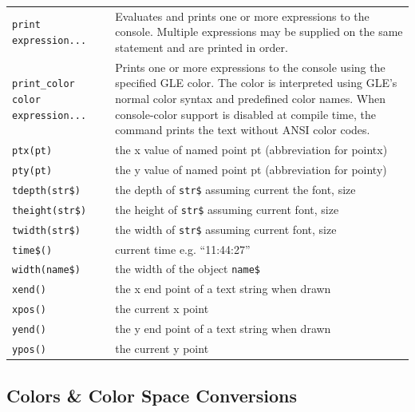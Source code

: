 \begin{supertabular}{lp{10cm}}
{\tt print expression...}  & Evaluates and prints one or more expressions to the console. Multiple expressions may be supplied on the same statement and are printed in order. \\
{\tt print\_color color expression...}  & Prints one or more expressions to the console using the specified GLE color. The color is interpreted using GLE's normal color syntax and predefined color names. When console-color support is disabled at compile time, the command prints the text without ANSI color codes. \\
{\tt ptx(pt)}           	& the x value of named point pt (abbreviation for pointx) \\
{\tt pty(pt)}          	& the y value of named point pt (abbreviation for pointy)\\
{\tt tdepth(str\$)}  	& the depth of {\tt str\$} assuming current the font, size \\
{\tt theight(str\$)}   & the height of {\tt str\$} assuming  current font, size \\
{\tt twidth(str\$)}  	& the width of {\tt str\$} assuming current font, size \\
{\tt time\$()}       	& current time e.g. ``11:44:27'' \\
{\tt width(name\$)}  	& the width of the object {\tt name\$} \\
{\tt xend()}           	& the x end point of a text string when drawn \\
{\tt xpos()}           	& the current x point \\
{\tt yend()}           	& the y end point of a text string when drawn \\
{\tt ypos()}           	& the current y point \\
\end{supertabular}


\subsection{Colors \& Color Space Conversions}

